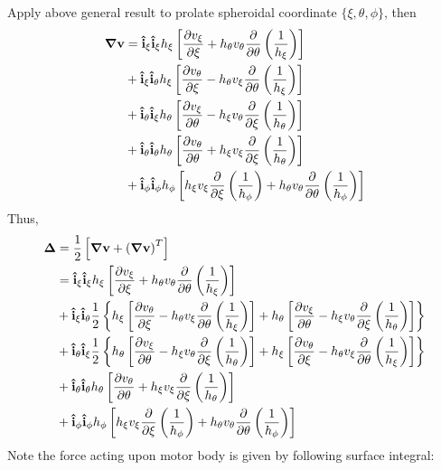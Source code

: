 \documentclass[fontsize=11pt, %
                             paper=a4, %
                             twoside, %
                             captions=tableheading,
                             index=totoc,
                             hyperref]{labbook}
\begin{document}
Apply above general result to prolate spheroidal coordinate $\{\xi,\theta,\phi\}$, then
\begin{equation}
\begin{aligned}
\mbox{\boldmath$ \nabla $} \mathbf{v}&=\mathbf{\hat{i}}_\xi \mathbf{\hat{i}}_\xi h_\xi\left[\frac{\partial v_\xi}{\partial \xi}+h_\theta v_\theta \frac{\partial }{\partial \theta}\left(\frac{1}{h_\xi}\right)\right]\\
&+\mathbf{\hat{i}}_\xi \mathbf{\hat{i}}_\theta h_\xi \left[\frac{\partial v_\theta}{\partial \xi}-h_\theta v_\xi \frac{\partial }{\partial \theta}\left(\frac{1}{h_\xi}\right)\right]\\
&+\mathbf{\hat{i}}_\theta \mathbf{\hat{i}}_\xi h_\theta \left[\frac{\partial v_\xi}{\partial \theta}-h_\xi v_\theta \frac{\partial }{\partial \xi}\left(\frac{1}{h_\theta}\right)\right]\\
&+\mathbf{\hat{i}}_\theta \mathbf{\hat{i}}_\theta h_\theta \left[\frac{\partial v_\theta}{\partial \theta}+h_\xi v_\xi \frac{\partial }{\partial \xi}\left(\frac{1}{h_\theta}\right)\right]\\
&+\mathbf{\hat{i}}_\phi \mathbf{\hat{i}}_\phi h_\phi \left[h_\xi v_\xi \frac{\partial }{\partial \xi}\left(\frac{1}{h_\phi}\right)+h_\theta v_\theta\frac{\partial }{\partial \theta}\left(\frac{1}{h_\phi}\right)\right]
\end{aligned}
\end{equation}
Thus,
\begin{equation}
\begin{aligned}
\mbox{\boldmath$ \Delta $}&=\frac{1}{2}\left[\mbox{\boldmath$ \nabla $} \mathbf{v} + \left(\mbox{\boldmath$ \nabla $} \mathbf{v}\right)^T\right]\\
&=\mathbf{\hat{i}}_\xi \mathbf{\hat{i}}_\xi h_\xi \left[\frac{\partial v_\xi}{\partial \xi}+h_\theta v_\theta \frac{\partial }{\partial \theta}\left(\frac{1}{h_\xi}\right)\right]\\
&+\mathbf{\hat{i}}_\xi \mathbf{\hat{i}}_\theta \frac{1}{2}\left\{h_\xi\left[\frac{\partial v_\theta}{\partial \xi}-h_\theta v_\xi \frac{\partial }{\partial \theta}\left(\frac{1}{h_\xi}\right)\right]+h_\theta\left[\frac{\partial v_\xi}{\partial \theta}-h_\xi v_\theta \frac{\partial }{\partial \xi}\left(\frac{1}{h_\theta}\right)\right]\right\}\\
&+\mathbf{\hat{i}}_\theta \mathbf{\hat{i}}_\xi \frac{1}{2}\left\{h_\theta\left[\frac{\partial v_\xi}{\partial \theta}-h_\xi v_\theta \frac{\partial }{\partial \xi}\left(\frac{1}{h_\theta}\right)\right]+h_\xi \left[\frac{\partial v_\theta}{\partial \xi}-h_\theta v_\xi \frac{\partial }{\partial \theta}\left(\frac{1}{h_\xi}\right)\right]\right\}\\
&+\mathbf{\hat{i}}_\theta \mathbf{\hat{i}}_\theta h_\theta \left[\frac{\partial v_\theta}{\partial \theta}+h_\xi v_\xi \frac{\partial }{\partial \xi}\left(\frac{1}{h_\theta}\right)\right]\\
&+\mathbf{\hat{i}}_\phi \mathbf{\hat{i}}_\phi h_\phi \left[h_\xi v_\xi \frac{\partial }{\partial \xi} \left(\frac{1}{h_\phi}\right)+h_\theta v_\theta \frac{\partial }{\partial \theta}\left(\frac{1}{h_\phi}\right)\right]
\end{aligned}
\end{equation}
Note the force acting upon motor body is given by following surface integral:
\end{document}
